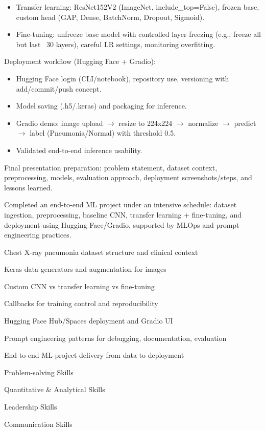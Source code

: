 \documentclass[12pt,a4paper]{article}
\begin{document}
{\begin{itemize}[leftmargin=*,nosep]
    \item Transfer learning: ResNet152V2 (ImageNet, include\_top=False), frozen base, custom head (GAP, Dense, BatchNorm, Dropout, Sigmoid).
    \item Fine-tuning: unfreeze base model with controlled layer freezing (e.g., freeze all but last ~30 layers), careful LR settings, monitoring overfitting.
  \end{itemize}
\item Deployment workflow (Hugging Face + Gradio):
  \begin{itemize}[leftmargin=*,nosep]
    \item Hugging Face login (CLI/notebook), repository use, versioning with add/commit/push concept.
    \item Model saving (.h5/.keras) and packaging for inference.
    \item Gradio demo: image upload $\rightarrow$ resize to 224x224 $\rightarrow$ normalize $\rightarrow$ predict $\rightarrow$ label (Pneumonia/Normal) with threshold 0.5.
    \item Validated end-to-end inference usability.
  \end{itemize}
\item Final presentation preparation: problem statement, dataset context, preprocessing, models, evaluation approach, deployment screenshots/steps, and lessons learned.
}
{
Completed an end-to-end ML project under an intensive schedule: dataset ingestion, preprocessing, baseline CNN, transfer learning + fine-tuning, and deployment using Hugging Face/Gradio, supported by MLOps and prompt engineering practices.
}
{
\item Chest X-ray pneumonia dataset structure and clinical context
\item Keras data generators and augmentation for images
\item Custom CNN vs transfer learning vs fine-tuning
\item Callbacks for training control and reproducibility
\item Hugging Face Hub/Spaces deployment and Gradio UI
\item Prompt engineering patterns for debugging, documentation, evaluation
}
{
End-to-end ML project delivery from data to deployment
}
{
\item Problem-solving Skills
\item Quantitative \& Analytical Skills
}
{
\item Leadership Skills
\item Communication Skills
}
\end{document}
